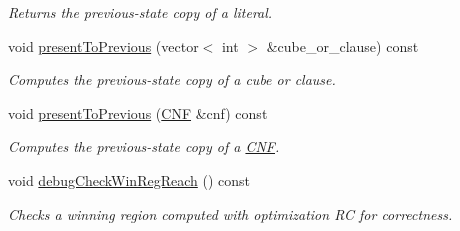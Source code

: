 \begin{DoxyCompactItemize}
\begin{DoxyCompactList}\small\item\em Returns the previous-\/state copy of a literal. \end{DoxyCompactList}\item 
void \hyperlink{classLearnSynthQBFInd_a9a336d870d76716b356a2870eb1bf9b7}{present\-To\-Previous} (vector$<$ int $>$ \&cube\-\_\-or\-\_\-clause) const 
\begin{DoxyCompactList}\small\item\em Computes the previous-\/state copy of a cube or clause. \end{DoxyCompactList}\item 
void \hyperlink{classLearnSynthQBFInd_a50be93ab3f6b7bd38c1f607dcb4b91b8}{present\-To\-Previous} (\hyperlink{classCNF}{C\-N\-F} \&cnf) const 
\begin{DoxyCompactList}\small\item\em Computes the previous-\/state copy of a \hyperlink{classCNF}{C\-N\-F}. \end{DoxyCompactList}\item 
void \hyperlink{classLearnSynthQBFInd_abb1bed24925bb028eeb33b2bfb8914a1}{debug\-Check\-Win\-Reg\-Reach} () const 
\begin{DoxyCompactList}\small\item\em Checks a winning region computed with optimization R\-C for correctness. \end{DoxyCompactList}\end{DoxyCompactItemize}
